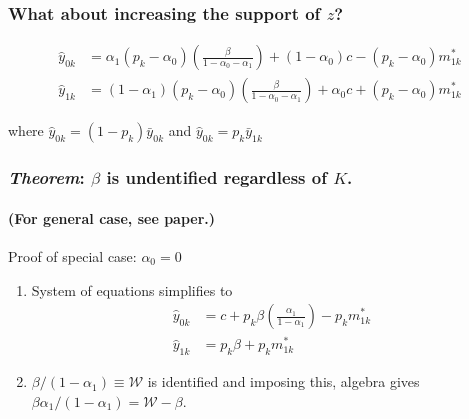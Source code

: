 \documentclass{beamer}
\begin{document}
\begin{frame}
  \frametitle{What about increasing the support of $z$?}
  \alert{}
\begin{align*}
  \hat{y}_{0k} &=\alpha_1(p_k - \alpha_0)\left(\frac{\beta}{1 - \alpha_0 - \alpha_1}\right) + (1-\alpha_0)c - (p _k -  \alpha_0)m_{1k}^* \\[1.5ex]
  \label{eq:MC1IV}
  \hat{y}_{1k} &=(1-\alpha_1)(p_k - \alpha_0)\left(\frac{\beta}{1 - \alpha_0 - \alpha_1}\right) + \alpha_0 c + (p _k -  \alpha_0)m_{1k}^*
\end{align*}

\vspace{0.5em}
where $\hat{y}_{0k}=(1-p_k)\bar{y}_{0k}$ and $\hat{y}_{0k}=p_k\bar{y}_{1k}$


\vspace{2em} 

\hfill \alert{}
\end{frame}
\begin{frame}
  \frametitle{\emph{Theorem}: $\beta$ is undentified regardless of $K$.}
  \framesubtitle{(For general case, see paper.)}
  \begin{block}{Proof of special case: $\alpha_0 = 0$ }
    \begin{enumerate}
      \item System of equations simplifies to 
    \vspace{0.5em}
\begin{align*}
  \hat{y}_{0k} &=c + p_k \beta \left(\frac{\alpha_1}{1 -  \alpha_1}\right) - p _k m_{1k}^* \\
  \hat{y}_{1k} &=p_k \beta + p _k m_{1k}^*
\end{align*}
  \item $\beta/(1-\alpha_1) \equiv \mathcal{W}$ is identified and imposing this, algebra gives $\beta\alpha_1/(1-\alpha_1) = \mathcal{W} - \beta$. 

    \end{enumerate}
  \end{block} 
    
\end{frame}
\end{document}
